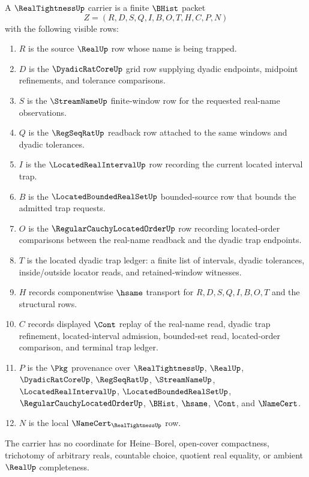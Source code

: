 \begin{definition}
\label{def:real-tightness-carrier}
A $\RealTightnessUp$ carrier is a finite $\BHist$ packet
$$
Z=(R,D,S,Q,I,B,O,T,H,C,P,N)
$$
with the following visible rows:
\begin{enumerate}
\item $R$ is the source $\RealUp$ row whose name is being trapped.
\item $D$ is the $\DyadicRatCoreUp$ grid row supplying dyadic endpoints, midpoint refinements, and tolerance comparisons.
\item $S$ is the $\StreamNameUp$ finite-window row for the requested real-name observations.
\item $Q$ is the $\RegSeqRatUp$ readback row attached to the same windows and dyadic tolerances.
\item $I$ is the $\LocatedRealIntervalUp$ row recording the current located interval trap.
\item $B$ is the $\LocatedBoundedRealSetUp$ bounded-source row that bounds the admitted trap requests.
\item $O$ is the $\RegularCauchyLocatedOrderUp$ row recording located-order comparisons between the real-name readback and the dyadic trap endpoints.
\item $T$ is the located dyadic trap ledger: a finite list of intervals, dyadic tolerances, inside/outside locator reads, and retained-window witnesses.
\item $H$ records componentwise $\hsame$ transport for $R,D,S,Q,I,B,O,T$ and the structural rows.
\item $C$ records displayed $\Cont$ replay of the real-name read, dyadic trap refinement, located-interval admission, bounded-set read, located-order comparison, and terminal trap ledger.
\item $P$ is the $\Pkg$ provenance over $\RealTightnessUp$, $\RealUp$, $\DyadicRatCoreUp$, $\RegSeqRatUp$, $\StreamNameUp$, $\LocatedRealIntervalUp$, $\LocatedBoundedRealSetUp$, $\RegularCauchyLocatedOrderUp$, $\BHist$, $\hsame$, $\Cont$, and $\NameCert$.
\item $N$ is the local $\NameCert_{\RealTightnessUp}$ row.
\end{enumerate}
The carrier has no coordinate for Heine--Borel, open-cover compactness, trichotomy of arbitrary reals, countable choice, quotient real equality, or ambient $\RealUp$ completeness.
\end{definition}

